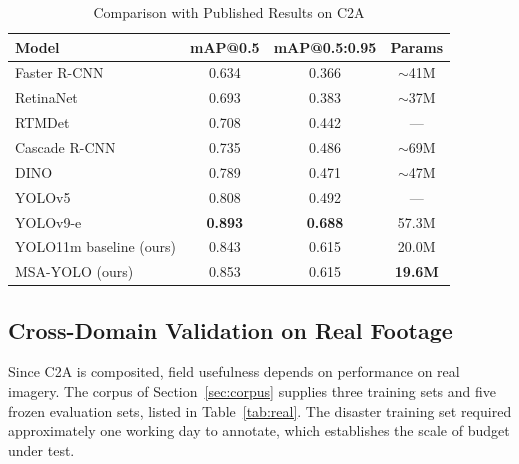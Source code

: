 \documentclass[conference,a4paper]{IEEEtran}
\begin{document}
\begin{table}[t]
\caption{Comparison with Published Results on C2A}
\label{tab:sota}
\begin{center}
\footnotesize
\setlength{\tabcolsep}{3pt}
\begin{tabular}{|l|c|c|c|}
\hline
\textbf{Model} & \textbf{mAP@0.5} & \textbf{mAP@0.5:0.95} & \textbf{Params} \\
\hline
Faster R-CNN & 0.634 & 0.366 & $\sim$41M \\
\hline
RetinaNet & 0.693 & 0.383 & $\sim$37M \\
\hline
RTMDet & 0.708 & 0.442 & --- \\
\hline
Cascade R-CNN & 0.735 & 0.486 & $\sim$69M \\
\hline
DINO & 0.789 & 0.471 & $\sim$47M \\
\hline
YOLOv5 & 0.808 & 0.492 & --- \\
\hline
YOLOv9-e & \textbf{0.893} & \textbf{0.688} & 57.3M \\
\hline
YOLO11m baseline (ours) & 0.843 & 0.615 & 20.0M \\
\hline
MSA-YOLO (ours) & 0.853 & 0.615 & \textbf{19.6M} \\
\hline
\end{tabular}
\end{center}
\end{table}

\subsection{Cross-Domain Validation on Real Footage}
\label{sec:real}
Since C2A is composited, field usefulness depends on performance on real
imagery. The corpus of Section~\ref{sec:corpus} supplies three training sets and
five frozen evaluation sets, listed in Table~\ref{tab:real}. The disaster
training set required approximately one working day to annotate, which
establishes the scale of budget under test.
\end{document}

